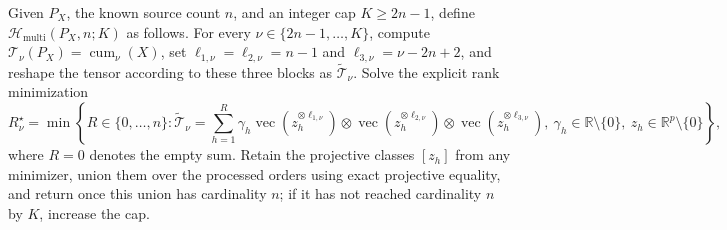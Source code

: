 Given \(P_X\), the known source count \(n\), and an integer cap \(K\ge2n-1\), define \(\mathcal H_{\mathrm{multi}}(P_X,n;K)\) as follows. For every \(\nu\in\{2n-1,\ldots,K\}\), compute \(\mathcal T_\nu(P_X)=\operatorname{cum}_\nu(X)\), set \(\ell_{1,\nu}=\ell_{2,\nu}=n-1\) and \(\ell_{3,\nu}=\nu-2n+2\), and reshape the tensor according to these three blocks as \(\widetilde{\mathcal T}_\nu\). Solve the explicit rank minimization
\[
 R_\nu^\star=
 \min\left\{
 R\in\{0,\ldots,n\}:
 \widetilde{\mathcal T}_\nu
 =\sum_{h=1}^{R}\gamma_h
 \operatorname{vec}(z_h^{\otimes\ell_{1,\nu}})\otimes
 \operatorname{vec}(z_h^{\otimes\ell_{2,\nu}})\otimes
 \operatorname{vec}(z_h^{\otimes\ell_{3,\nu}}),\ 
 \gamma_h\in\mathbb R\setminus\{0\},\ 
 z_h\in\mathbb R^p\setminus\{0\}
 \right\},
\]
where \(R=0\) denotes the empty sum. Retain the projective classes \([z_h]\) from any minimizer, union them over the processed orders using exact projective equality, and return once this union has cardinality \(n\); if it has not reached cardinality \(n\) by \(K\), increase the cap.